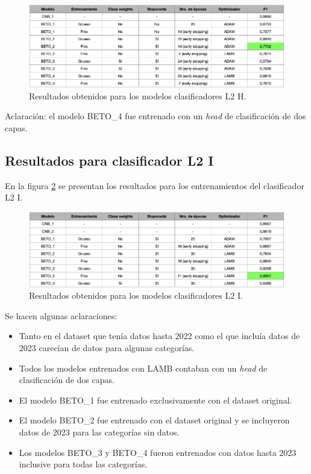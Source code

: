 \begin{figure}[htbp]
	\centering
	\includegraphics[width=1\textwidth]{./Figures/cap4-resultados-l2h.png}
	\caption{Resultados obtenidos para los modelos clasificadores L2 H.}
	\label{fig:res-l2h}
\end{figure}

Aclaración: el modelo BETO\_4 fue entrenado con un \textit{head} de clasificación de dos capas.

\subsection{Resultados para clasificador L2 I}

En la figura \ref{fig:res-l2i} se presentan los resultados para los entrenamientos del clasificador L2 I.

\begin{figure}[htbp]
	\centering
	\includegraphics[width=1\textwidth]{./Figures/cap4-resultados-l2i.png}
	\caption{Resultados obtenidos para los modelos clasificadores L2 I.}
	\label{fig:res-l2i}
\end{figure}

Se hacen algunas aclaraciones:
\begin{itemize}
	\item Tanto en el dataset que tenía datos hasta 2022 como el que incluía datos de 2023 carecían de datos para algunas categorías.
	\item Todos los modelos entrenados con LAMB contaban con un \textit{head} de clasificación de dos capas.
	\item El modelo BETO\_1 fue entrenado exclusivamente con el dataset original.
	\item El modelo BETO\_2 fue entrenado con el dataset original y se incluyeron datos de 2023 para las categorías sin datos.
	\item Los modelos BETO\_3 y BETO\_4 fueron entrenados con datos hasta 2023 inclusive para todas las categorías.
\end{itemize}

